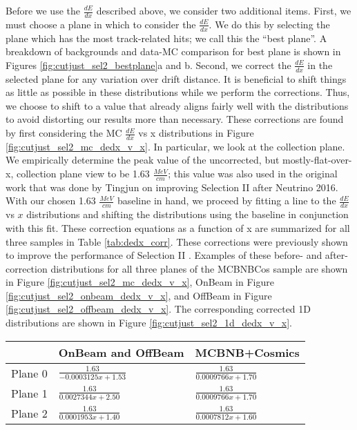 \documentclass{article}
\begin{document}
\par Before we use the $\frac{dE}{dx}$ described above, we consider two additional items. First, we must choose a plane in which to consider the $\frac{dE}{dx}$.  We do this by selecting the plane which has the most track-related hits; we call this the ``best plane''. A breakdown of backgrounds and data-MC comparison for best plane is shown in Figures \ref{fig:cutjust_sel2_bestplane}a and b. Second, we correct the $\frac{dE}{dx}$ in the selected plane for any variation over drift distance. It is beneficial to shift things as little as possible in these distributions while we perform the corrections. Thus, we choose to shift to a value that already aligns fairly well with the distributions to avoid distorting our results more than necessary.  These corrections are found by first considering the MC $\frac{dE}{dx}$ vs x distributions in Figure \ref{fig:cutjust_sel2_mc_dedx_v_x}. In particular, we look at the collection plane. We empirically determine the peak value of the uncorrected, but mostly-flat-over-x, collection plane view to be 1.63 $\frac{MeV}{cm}$; this value was also used in the original work that was done by Tingjun on improving Selection II after Neutrino 2016. With our chosen 1.63 $\frac{MeV}{cm}$ baseline in hand, we proceed by fitting a line to the $\frac{dE}{dx}$ vs $x$ distributions and shifting the distributions using the baseline in conjunction with this fit. These correction equations as a function of x are summarized for all three samples in Table \ref{tab:dedx_corr}. These corrections were previously shown to improve the performance of Selection II \cite{bib:6172}. Examples of these before- and after-correction distributions for all three planes of the MCBNBCos sample are shown in Figure \ref{fig:cutjust_sel2_mc_dedx_v_x}, OnBeam in Figure \ref{fig:cutjust_sel2_onbeam_dedx_v_x}, and OffBeam in Figure \ref{fig:cutjust_sel2_offbeam_dedx_v_x}. The corresponding corrected 1D distributions are shown in Figure \ref{fig:cutjust_sel2_1d_dedx_v_x}.  

\begin{table} 
 \centering
 \begin{tabular}{| l | l | l |}
  \hline
  & OnBeam and OffBeam & MCBNB+Cosmics \\ [0.1ex] \hline
Plane 0 & $\frac{1.63}{-0.0003125x + 1.53}$ & $\frac{1.63}{0.0009766x + 1.70}$ \\ \hline
Plane 1 & $\frac{1.63}{0.0027344x + 2.50}$ & $\frac{1.63}{0.0009766x + 1.70}$ \\ \hline 
Plane 2 & $\frac{1.63}{0.0001953x + 1.40}$ & $\frac{1.63}{0.0007812x + 1.60}$ \\  \hline
\end{tabular}
\end{table}
\end{document}
